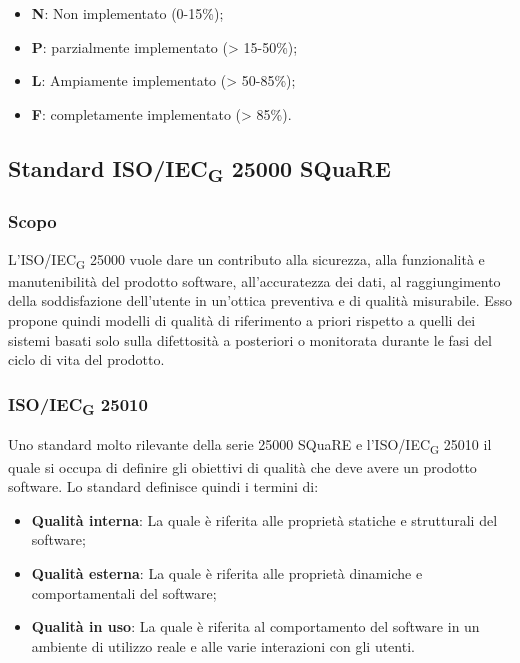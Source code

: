 \begin{itemize}
	\item \textbf{N}: Non implementato (0-15\%);
	\item \textbf{P}: parzialmente implementato (> 15-50\%);
	\item \textbf{L}: Ampiamente implementato (> 50-85\%);
	\item \textbf{F}: completamente implementato (> 85\%).
\end{itemize}
\subsection{Standard ISO/IEC\textsubscript{G} 25000 SQuaRE}
\subsubsection{Scopo}
L'ISO/IEC\textsubscript{G} 25000 vuole dare un contributo alla sicurezza, alla funzionalità e manutenibilità del prodotto software, all'accuratezza dei dati, al raggiungimento della soddisfazione dell'utente in un'ottica preventiva e di qualità misurabile. Esso propone quindi modelli di qualità di riferimento a priori rispetto a quelli dei sistemi basati solo sulla difettosità a posteriori o monitorata durante le fasi del ciclo di vita del prodotto.
\subsubsection{ISO/IEC\textsubscript{G} 25010}
Uno standard molto rilevante della serie 25000 SQuaRE e l'ISO/IEC\textsubscript{G} 25010 il quale si occupa di definire gli obiettivi di qualità che deve avere un prodotto software.
Lo standard definisce quindi i termini di:
\begin{itemize}
	\item \textbf{Qualità interna}: La quale è riferita alle proprietà statiche e strutturali del software;
	\item \textbf{Qualità esterna}: La quale è riferita alle proprietà dinamiche e comportamentali del software;
	\item \textbf{Qualità in uso}: La quale è riferita al comportamento del software in un ambiente di utilizzo reale e alle varie interazioni con gli utenti.
\end{itemize}
